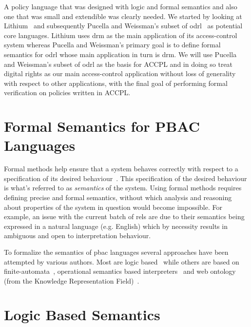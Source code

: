 A policy language that was designed with logic and formal semantics and also one that was small and extendible was clearly needed. We started by looking at Lithium~\cite{Halpern2008} and subsequently Pucella and Weissman's subset of \ac{odrl}~\cite{pucella2006} as potential core languages. Lithium uses \ac{drm} as the main application of its access-control system whereas Pucella and Weissman's primary goal is to define formal semantics for \ac{odrl} whose main application in turn is \ac{drm}. We will use Pucella and Weissman's subset of \ac{odrl} as the basis for \ac{ACCPL} and in doing so treat digital rights as our main access-control application without loss of generality with respect to other applications, with the final goal of performing formal verification on policies written in \ac{ACCPL}.



\section{Formal Semantics for PBAC Languages}


Formal methods help ensure that a system behaves correctly with respect to a specification of its desired behaviour~\cite{TAPL}. This specification of the desired behaviour is what's referred to as \emph{semantics} of the system. Using formal methods requires defining precise and formal semantics, without which analysis and reasoning about properties of the system in question would become impossible. For example, an issue with the current batch of \ac{rel}s are due to their semantics being expressed in a natural language (e.g. English) which by necessity results in ambiguous and open to interpretation behaviour. 

To formalize the semantics of \ac{pbac} languages several approaches have been attempted by various authors. Most are logic based~\cite{Halpern2008, pucella2006} while others are based on finite-automata~\cite{Holzer}, operational semantics based interpreters~\cite{Safavi-naini} and web ontology (from the Knowledge Representation Field)~\cite{Kasten2010MTS}. 


\section{Logic Based Semantics}


